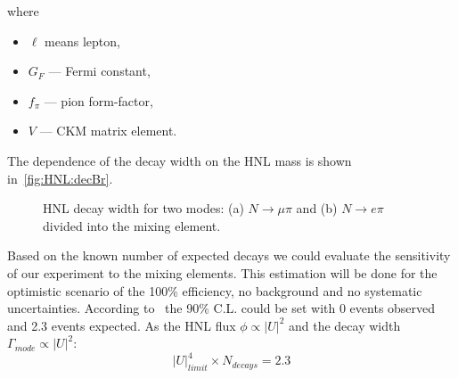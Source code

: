 \documentclass[../main.tex]{subfiles}
\begin{document}
where
\begin{itemize}
    \item $\ell$ means lepton,
    \item $G_F$ --- Fermi constant,
    \item $f_\pi$ --- pion form-factor,
    \item $V$ --- CKM matrix element.
\end{itemize}

The dependence of the decay width on the HNL mass is shown in~\autoref{fig:HNL:decBr}.

\begin{figure}[!ht]
    \begin{minipage}[!ht]{0.49\linewidth}
    \end{minipage}
    \hfill
    \begin{minipage}[!ht]{0.49\linewidth}
    \end{minipage}
    \caption{HNL decay width for two modes: (a) $N\to \mu\pi$ and (b) $N\to e\pi$ divided into the mixing element.}
    \label{fig:HNL:decBr}
\end{figure}

Based on the known number of expected decays we could evaluate the sensitivity of our experiment to the mixing elements. This estimation will be done for the optimistic scenario of the 100\% efficiency, no background and no systematic uncertainties. According to~\cite{Cousins1992} the 90\% C.L. could be set with 0 events observed and 2.3 events expected. As the HNL flux $\phi\propto\left|U\right|^2$ and the decay width $\Gamma_{mode}\propto\left|U\right|^2$:
\begin{equation}
    \left|U\right|^4_{limit} \times N_{decays} = 2.3
\end{equation}
\end{document}

